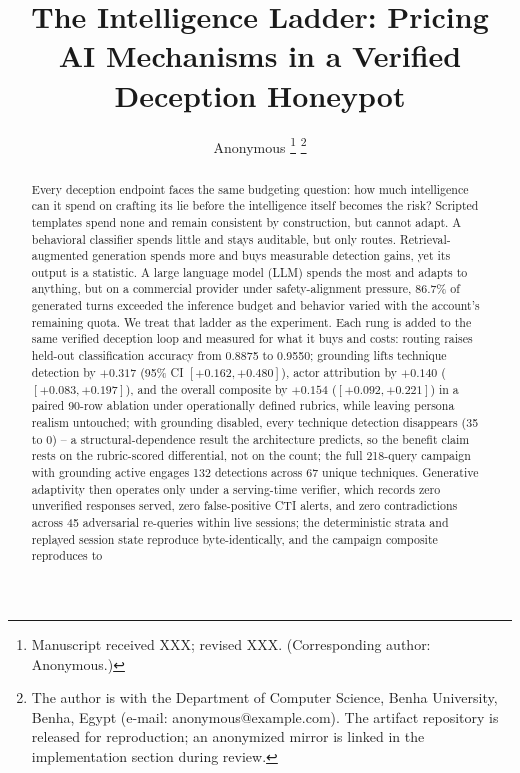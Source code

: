 \documentclass[journal]{IEEEtran}
\begin{document}
\title{The Intelligence Ladder: Pricing AI Mechanisms in a Verified
Deception Honeypot}

\author{Anonymous%
\thanks{Manuscript received XXX; revised XXX. (Corresponding author: Anonymous.)}%
\thanks{The author is with the Department of Computer Science, Benha University, Benha, Egypt (e-mail: anonymous@example.com). The artifact repository is released for reproduction; an anonymized mirror is linked in the implementation section during review.}}

\maketitle

\begin{abstract}
Every deception endpoint faces the same budgeting question: how much
intelligence can it spend on crafting its lie before the intelligence
itself becomes the risk? Scripted templates spend none and remain
consistent by construction, but cannot adapt. A behavioral classifier spends little and
stays auditable, but only routes. Retrieval-augmented generation spends
more and buys measurable detection gains, yet its output is a statistic.
A large language model (LLM) spends the most and adapts to anything, but
on a commercial provider under safety-alignment pressure, 86.7\% of
generated turns exceeded the inference budget and behavior varied with
the account's remaining
quota. We treat that ladder as the experiment. Each rung is
added to the same verified deception loop and measured for what it buys
and costs: routing
raises held-out classification accuracy from 0.8875 to 0.9550; grounding
lifts technique detection by $+0.317$ (95\% CI $[+0.162,+0.480]$), actor
attribution by $+0.140$ ($[+0.083,+0.197]$), and the overall composite by
$+0.154$ ($[+0.092,+0.221]$) in a paired 90-row ablation under
operationally defined rubrics, while leaving persona realism untouched;
with grounding disabled, every technique detection disappears (35 to 0)
-- a structural-dependence result the architecture predicts, so the
benefit claim rests on the rubric-scored differential, not on the count;
the full 218-query campaign with grounding active engages 132 detections
across 67 unique techniques. Generative
adaptivity then operates only under a serving-time verifier, which
records zero unverified responses served, zero false-positive CTI
alerts, and zero contradictions across 45 adversarial re-queries within
live sessions; the deterministic strata and replayed session state
reproduce byte-identically, and the campaign composite reproduces to

\end{abstract}
\end{document}
